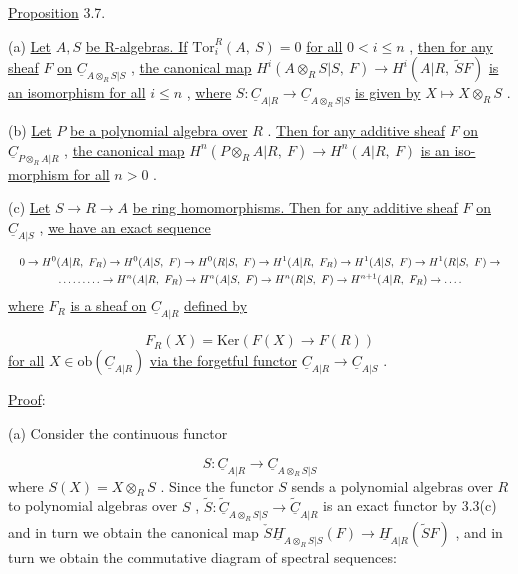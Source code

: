 \underline{Proposition} 3.7.

(a)  \underline{Let}  $A, S$  \underline{be R-algebras. If}  $\mathrm{Tor}^R_i(A,\ S) = 0$  \underline{for all}  $0 < i \leq n$  , \underline{then for any sheaf}  $F$  \underline{on}  $\underline{C}_{A\otimes_R S|S}$  , \underline{the canonical map}  $H^i(A\otimes_R S|S,\ F) \to H^i(A|R,\ \widetilde{S}F)$ \underline{is an isomorphism for all}  $i \leq n$  , \underline{where}  $S : \underline{C}_{A|R} \to \underline{C}_{A\otimes_R S|S}$  \underline{is given by} $X \longmapsto X\otimes_R S$  .

(b)  \underline{Let}  $P$  \underline{be a polynomial algebra over}  $R$  . \underline{Then for any additive sheaf}  $F$  \underline{on}  $\underline{C}_{P\otimes_R A|R}$  , \underline{the canonical map}  $H^n(P\otimes_R A|R,\ F) \to H^n(A|R,\ F)$  \underline{is an iso-morphism for all}  $n > 0$  .

(c)  \underline{Let}  $S \to R \to A$  \underline{be ring homomorphisms. Then for any additive sheaf}  $F$  \underline{on}  $\underline{C}_{A|S}$  , \underline{we have an exact sequence}

\begin{equation*}
\resizebox{\textwidth}{!}{$\begin{gathered}
0 \to H^0(A|R,\ F_R) \to H^0(A|S,\ F) \to H^0(R|S,\ F) \to H^1(A|R,\ F_R) \to H^1(A|S,\ F) \to H^1(R|S,\ F) \to \\
\ldots\ldots\ldots \to H^n(A|R,\ F_R) \to H^n(A|S,\ F) \to H^n(R|S,\ F) \to H^{n+1}(A|R,\ F_R) \to \ldots.
\end{gathered}$}
\end{equation*}
\underline{where}  $F_R$  \underline{is a sheaf on}  $\underline{C}_{A|R}$ \underline{defined by}

\begin{equation*}
F_R(X) = \mathrm{Ker}(F(X) \to F(R))
\end{equation*}
\underline{for all}  $X \in \mathrm{ob}(\underline{C}_{A|R})$  \underline{via the forgetful functor}  $\underline{C}_{A|R} \to \underline{C}_{A|S}$  .


\underline{Proof}:

(a)  Consider the continuous functor

\begin{equation*}
S : \underline{C}_{A|R} \to \underline{C}_{A\otimes_R S|S}
\end{equation*}
where  $S(X) = X\otimes_R S$  . Since the functor  $S$  sends a polynomial algebras over  $R$  to polynomial algebras over  $S$  ,  $\widetilde{S} : \widetilde{\underline{C}}_{A\otimes_R S|S} \to \widetilde{\underline{C}}_{A|R}$  is an exact functor by 3.3(c) and in turn we obtain the canonical map  $\check{S}\underline{H}^{\cdot}_{A\otimes_R S|S}(F) \to \underline{H}^{\cdot}_{A|R}(\widetilde{S}F)$  , and in turn we obtain the commutative diagram of spectral sequences:

